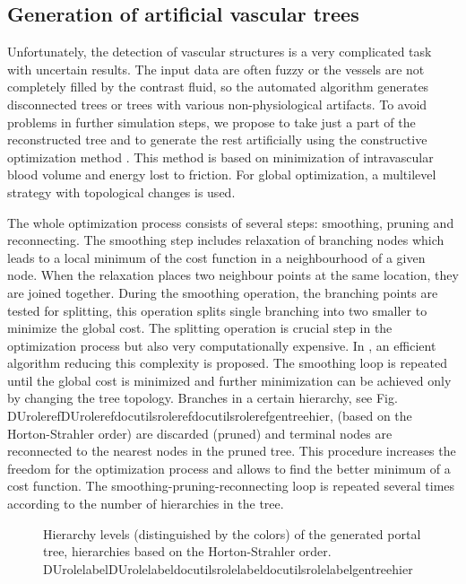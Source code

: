 \documentclass[letterpaper,compsoc,twoside]{IEEEtran}
\providecommand*{\DUrole}[2]{\ifcsname DUrole#1\endcsname \csname DUrole#1\endcsname{#2}\else \ifcsname docutilsrole#1\endcsname \csname docutilsrole#1\endcsname{#2}\else #2\fi \fi }
\begin{document}
\subsection{Generation of artificial vascular trees\label{generation-of-artificial-vascular-trees}}


Unfortunately, the detection of vascular structures is a very
complicated task with uncertain results. The input data are often
fuzzy or the vessels are not completely filled by the contrast fluid,
so the automated algorithm generates disconnected trees or trees with
various non-physiological artifacts. To avoid problems in further
simulation steps, we propose to take just a part of the reconstructed
tree and to generate the rest artificially using the constructive
optimization method \cite{Geo10}. This method is based on minimization of
intravascular blood volume and energy lost to friction. For global
optimization, a multilevel strategy with topological changes is used.

The whole optimization process consists of several steps: smoothing,
pruning and reconnecting. The smoothing step includes relaxation of
branching nodes which leads to a local minimum of the cost function in
a neighbourhood of a given node. When the relaxation places two
neighbour points at the same location, they are joined
together. During the smoothing operation, the branching points are
tested for splitting, this operation splits single branching into two
smaller to minimize the global cost. The splitting operation is
crucial step in the optimization process but also very computationally
expensive. In \cite{Geo10}, an efficient algorithm reducing this complexity
is proposed. The smoothing loop is repeated until the global cost is
minimized and further minimization can be achieved only by changing
the tree topology. Branches in a certain hierarchy, see
Fig. \DUrole{ref}{gentreehier}, (based on the Horton-Strahler order) are
discarded (pruned) and terminal nodes are reconnected to the nearest
nodes in the pruned tree. This procedure increases the freedom for the
optimization process and allows to find the better minimum of a cost
function. The smoothing-pruning-reconnecting loop is repeated several
times according to the number of hierarchies in the tree.\begin{figure}[]\noindent{}
\caption{Hierarchy levels (distinguished by the colors) of the generated
portal tree, hierarchies based on the Horton-Strahler
order. \DUrole{label}{gentreehier}}
\end{figure}
\end{document}

